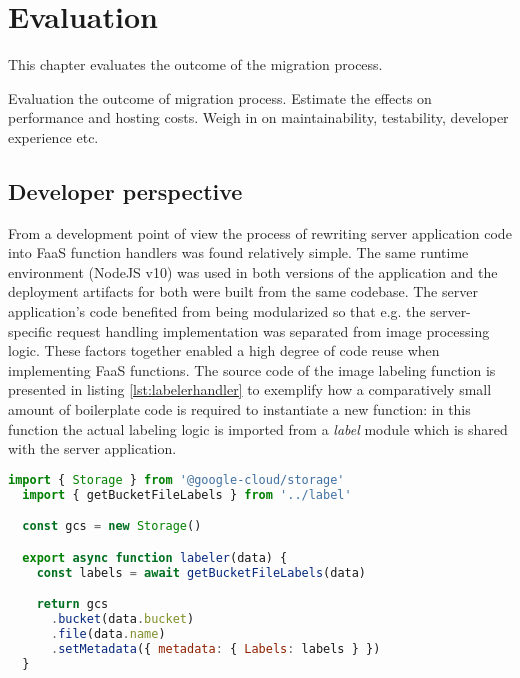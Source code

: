 \chapter{Evaluation} \label{cha:evaluation}

This chapter evaluates the outcome of the migration process.

Evaluation the outcome of migration process. Estimate the effects on performance and hosting costs. Weigh in on maintainability, testability, developer experience etc.

\section{Developer perspective}

From a development point of view the process of rewriting server application code into FaaS function handlers was found relatively simple. The same runtime environment (NodeJS v10) was used in both versions of the application and the deployment artifacts for both were built from the same codebase. The server application's code benefited from being modularized so that e.g. the server-specific request handling implementation was separated from image processing logic. These factors together enabled a high degree of code reuse when implementing FaaS functions. The source code of the image labeling function is presented in listing \ref{lst:labelerhandler} to exemplify how a comparatively small amount of boilerplate code is required to instantiate a new function: in this function the actual labeling logic is imported from a \textit{label} module which is shared with the server application.

\begin{lstlisting}[language=JavaScript,caption=Image labeler function handler,captionpos=b,label=lst:labelerhandler,showstringspaces=false,belowskip=2em,frame=tb,aboveskip=2em]
  import { Storage } from '@google-cloud/storage'
  import { getBucketFileLabels } from '../label'

  const gcs = new Storage()

  export async function labeler(data) {
    const labels = await getBucketFileLabels(data)

    return gcs
      .bucket(data.bucket)
      .file(data.name)
      .setMetadata({ metadata: { Labels: labels } })
  }
\end{lstlisting}


